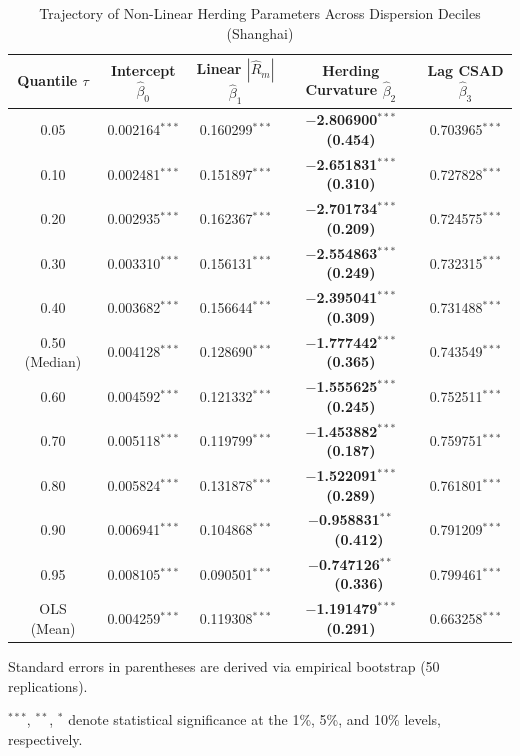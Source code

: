 \documentclass[12pt, a4paper]{article}
\begin{document}
\begin{table}[H]
  \centering
  \caption{Trajectory of Non-Linear Herding Parameters Across Dispersion Deciles (Shanghai)}
  \label{tab:qr_coefs}
  \begin{threeparttable}
  \begin{tabular}{ccccc}
    \toprule
    Quantile $\tau$ & Intercept $\hat\beta_0$ & Linear $|\hat R_m|$ $\hat\beta_1$
      & \textbf{Herding Curvature} $\hat\beta_2$ & Lag CSAD $\hat\beta_3$ \\
    \midrule
    0.05           & 0.002164$^{***}$ & 0.160299$^{***}$ & \textbf{$-$2.806900$^{***}$ (0.454)} & 0.703965$^{***}$ \\
    0.10           & 0.002481$^{***}$ & 0.151897$^{***}$ & \textbf{$-$2.651831$^{***}$ (0.310)} & 0.727828$^{***}$ \\
    0.20           & 0.002935$^{***}$ & 0.162367$^{***}$ & \textbf{$-$2.701734$^{***}$ (0.209)} & 0.724575$^{***}$ \\
    0.30           & 0.003310$^{***}$ & 0.156131$^{***}$ & \textbf{$-$2.554863$^{***}$ (0.249)} & 0.732315$^{***}$ \\
    0.40           & 0.003682$^{***}$ & 0.156644$^{***}$ & \textbf{$-$2.395041$^{***}$ (0.309)} & 0.731488$^{***}$ \\
    0.50 (Median)  & 0.004128$^{***}$ & 0.128690$^{***}$ & \textbf{$-$1.777442$^{***}$ (0.365)} & 0.743549$^{***}$ \\
    0.60           & 0.004592$^{***}$ & 0.121332$^{***}$ & \textbf{$-$1.555625$^{***}$ (0.245)} & 0.752511$^{***}$ \\
    0.70           & 0.005118$^{***}$ & 0.119799$^{***}$ & \textbf{$-$1.453882$^{***}$ (0.187)} & 0.759751$^{***}$ \\
    0.80           & 0.005824$^{***}$ & 0.131878$^{***}$ & \textbf{$-$1.522091$^{***}$ (0.289)} & 0.761801$^{***}$ \\
    0.90           & 0.006941$^{***}$ & 0.104868$^{***}$ & \textbf{$-$0.958831$^{**}$\ \ (0.412)} & 0.791209$^{***}$ \\
    0.95           & 0.008105$^{***}$ & 0.090501$^{***}$ & \textbf{$-$0.747126$^{**}$\ \ (0.336)} & 0.799461$^{***}$ \\
    \midrule
    OLS (Mean)     & 0.004259$^{***}$ & 0.119308$^{***}$ & \textbf{$-$1.191479$^{***}$ (0.291)} & 0.663258$^{***}$ \\
    \bottomrule
  \end{tabular}
  \begin{tablenotes}
    \footnotesize
    \item Standard errors in parentheses are derived via empirical bootstrap (50 replications).
    \item $^{***}$, $^{**}$, $^{*}$ denote statistical significance at the 1\%, 5\%, and 10\% levels, respectively.
  \end{tablenotes}
  \end{threeparttable}
\end{table}
\end{document}

